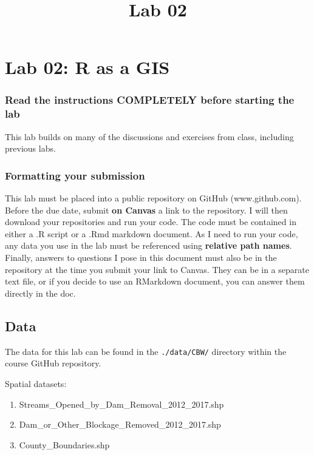 \documentclass[
]{article}
\title{Lab 02}
\author{}
\date{\vspace{-2.5em}}
\begin{document}
\maketitle

\section{Lab 02: R as a GIS}\label{lab-02-r-as-a-gis}

\subsubsection{Read the instructions COMPLETELY before starting the
lab}\label{read-the-instructions-completely-before-starting-the-lab}

This lab builds on many of the discussions and exercises from class,
including previous labs.

\subsubsection{Formatting your
submission}\label{formatting-your-submission}

This lab must be placed into a public repository on GitHub
(www.github.com). Before the due date, submit \textbf{on Canvas} a link
to the repository. I will then download your repositories and run your
code. The code must be contained in either a .R script or a .Rmd
markdown document. As I need to run your code, any data you use in the
lab must be referenced using \textbf{relative path names}. Finally,
answers to questions I pose in this document must also be in the
repository at the time you submit your link to Canvas. They can be in a
separate text file, or if you decide to use an RMarkdown document, you
can answer them directly in the doc.

\subsection{Data}\label{data}

The data for this lab can be found in the \texttt{./data/CBW/} directory
within the course GitHub repository.

Spatial datasets:

\begin{enumerate}
\def\labelenumi{\arabic{enumi}.}
\item
  Streams\_Opened\_by\_Dam\_Removal\_2012\_2017.shp
\item
  Dam\_or\_Other\_Blockage\_Removed\_2012\_2017.shp
\item
  County\_Boundaries.shp
\end{enumerate}
\end{document}
